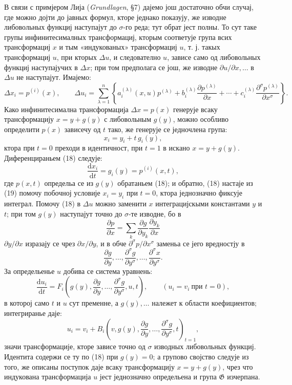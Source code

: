 ﻿\documentclass[11pt]{article}
\providecommand{\G}{\mathfrak G}
\providecommand{\D}{\Delta}
\providecommand{\p}{\partial}
\providecommand{\dd}{\mathrm d}
\begin{document}
В связи с примјером Лија (\emph{Grundlagen}, \S{}7) дајемо још достаточно обчи случај, где можно дојти до јавных формул, кторе једнако показују, же изводне либовольных функциј наступајут до \(\sigma\)-го реда; тут обрат јест полны. То сут таке групы инфинитесималных трансформациј, кторым соответује група всих трансформациј \(x\) и тым «индукованых» трансформациј \(u\), т. ј. такых трансформациј \(u\), при кторых \(\D u\), и следователно \(u\), зависе само од либовольных функциј наступајучих в \(\D x\); при том предполага се још, же изводне \(\p u/\p x,\ldots\) в \(\D u\) не наступајут. Имајемо:
\[
\D x_i=p^{(i)}(x),\qquad
\D u_i=
\sum_{\lambda=1}^{n}\left\{
a_i^{(\lambda)}(x,u)p^{(\lambda)}
+b_i^{(\lambda)}\frac{\p p^{(\lambda)}}{\p x}
+\cdots+
c_i^{(\lambda)}\frac{\p^\sigma p^{(\lambda)}}{\p x^\sigma}
\right\}.
\]
Како инфинитесимална трансформација \(\D x=p(x)\) генерује всаку трансформацију \(x=y+g(y)\) с либовольным \(g(y)\), можно особливо определити \(p(x)\) зависечу од \(t\) тако, же генерује се једночлена група:
\begin{equation}
x_i=y_i+t\,g_i(y),
\tag{18}
\end{equation}
ктора при \(t=0\) преходи в идентичност, при \(t=1\) в искано \(x=y+g(y)\). Диференцираньем (18) следује:
\begin{equation}
\frac{\dd x_i}{\dd t}=g_i(y)=p^{(i)}(x,t),
\tag{19}
\end{equation}
где \(p(x,t)\) определьа се из \(g(y)\) обратаньем (18); и обратно, (18) настаје из (19) помочу побочној условије \(x_i=y_i\) при \(t=0\), ктора једнозначно фиксује интеграл. Помочу (18) в \(\D u\) можно заменити \(x\) интеграцијскыми константами \(y\) и \(t\); при том \(g(y)\) наступајут точно до \(\sigma\)-те изводне, бо в
\[
\frac{\p p}{\p x}=\sum_k\frac{\p g}{\p y_k}\frac{\p y_k}{\p x}
\]
\(\p y/\p x\) изразају се чрез \(\p x/\p y\), и в обче \(\p^\sigma p/\p x^\sigma\) заменьа се јего вредностју в
\[
\frac{\p g}{\p y},\ldots,\frac{\p^\sigma g}{\p y^\sigma},\ldots,\frac{\p^\sigma x}{\p y^\sigma}.
\]
За определьенье \(u\) добива се система уравнень:
\[
\frac{\dd u_i}{\dd t}
=
F_i\!\left(g(y),\frac{\p g}{\p y},\ldots,\frac{\p^\sigma g}{\p y^\sigma},u,t\right),
\qquad (u_i=v_i\ \text{при }t=0),
\]
в которој само \(t\) и \(u\) сут пременне, а \(g(y),\ldots\) належет к области коефициентов; интегриранье даје:
\[
u_i=v_i+
B_i\!\left(v,g(y),\frac{\p g}{\p y},\ldots,\frac{\p^\sigma g}{\p y^\sigma},t\right)_{t=1},
\]
значи трансформације, кторе зависе точно од \(\sigma\) изводных либовольных функциј. Идентита содержи се ту по (18) при \(g(y)=0\); а групово својство следује из того, же описаны поступок даје всаку трансформацију \(x=y+g(y)\), чрез что индукована трансформација \(u\) јест једнозначно определьена и група \(\G\) изчерпана.
\end{document}
